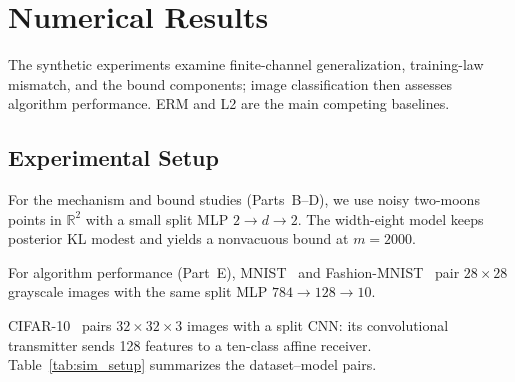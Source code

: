 \providecommand{\simroot}{.}
\providecommand{\E}{\mathbb E}
\providecommand{\TV}{\operatorname{TV}}
\section{Numerical Results}
\label{sec:simulation}

The synthetic experiments examine finite-channel generalization, training-law
mismatch, and the bound components; image classification then assesses
algorithm performance. ERM and L2 are the main competing baselines.

\subsection{Experimental Setup}
\label{sec:sim_setup}

For the mechanism and bound studies (Parts~B--D), we use noisy two-moons
points in $\mathbb R^2$ with a small split MLP $2\to d\to2$.
The width-eight model keeps posterior KL modest and yields a nonvacuous
bound at $m=2000$.

For algorithm performance (Part~E), MNIST~\cite{mnist_dataset} and
Fashion-MNIST~\cite{fashion_mnist} pair $28\times28$ grayscale images with
the same split MLP $784\to128\to10$.

CIFAR-10~\cite{cifar10} pairs $32\times32\times3$ images with a split CNN:
its convolutional transmitter sends 128 features to a ten-class affine
receiver. Table~\ref{tab:sim_setup} summarizes the dataset--model pairs.

